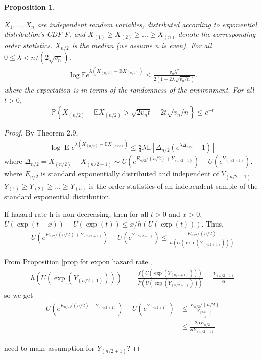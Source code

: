 \documentclass{article}
\theoremstyle{plain}
\newtheorem{prop}{Proposition}
\begin{document}
\begin{prop}
\label{prop 4.6}

$X_1, ..., X_n$ are independent random variables, distributed according to exponential distribution's CDF F, and $X_{(1)} \geq X_{(2)} \geq ... \geq X_{(n)}$ denote the corresponding order statistics. $X_{n/2}$ is the median (we assume n is even). For all $0 \leq \lambda<n /\left(2 \sqrt{v_{n}}\right)$, 
\begin{align}
    \log \mathbb{E}e^{\lambda\left(X_{(n / 2)}-\mathrm{E} X_{(n / 2)}\right)} \leq \frac{v_{n} \lambda^{2}}{2\left(1-2 \lambda \sqrt{v_{n} / n}\right)}.
\end{align}
where the expectation is in terms of the randomness of the environment. For all $t > 0$,
\begin{align}
    \mathbb{P}\left\{X_{(n / 2)}-\mathbb{E} X_{(n / 2)}>\sqrt{2 v_{n} t}+2 t \sqrt{v_{n} / n}\right\} \leq e^{-t}
\end{align}
\end{prop}

\begin{proof}
By \cite{boucheron2012} Theorem 2.9, 
\begin{align}
    \log \operatorname{E} e^{\lambda\left(X_{(n / 2)}-\mathbb{E} X_{(n / 2)}\right)} \leq \frac{n}{4} \lambda \mathbb{E}\left[\Delta_{n / 2}\left(e^{\lambda \Delta_{n / 2}}-1\right)\right]
\end{align}
where $\Delta_{n / 2}=X_{(n / 2)}-X_{(n / 2+1)} \sim U\left(e^{E_{n / 2} /(n / 2)+Y_{(n / 2+1)}} \right)-U\left(e^{Y_{(n / 2+1)}}\right).$ where $E_{n/2}$ is standard exponentially distributed and independent of $Y_{(n/2 + 1)}$. $Y_{(1)} \geq Y_{(2)} \geq ... \geq Y_{(n)}$ is the order statistics of an independent sample of the standard exponential distribution. 

If hazard rate h is non-decreasing, then for all $t > 0$ and $x > 0$, $U(\exp (t+x))-U(\exp (t)) \leq x / h(U(\exp (t)))$. Thus, 
\begin{align}
    U\left(e^{E_{n / 2} /(n / 2)+Y_{(n / 2+1)}} \right)-U\left(e^{Y_{(n / 2+1)}}\right) \leq \frac{E_{n / 2} /(n / 2)}{h(U(\exp{(Y_{(n/2+1)})}))}
\end{align}

From Proposition \ref{prop for expon hazard rate}, 
\begin{align}
    h(U(\exp{(Y_{(n/2+1)})})) &= \frac{f(U(\exp (Y_{(n/2+1)})))}{\overline{F}({U}(\exp (Y_{(n/2+1)})))} = \frac{Y_{(n/2+1)}}{\alpha} 
\end{align}
so we get 
\begin{align}
    U\left(e^{E_{n / 2} /(n / 2)+Y_{(n / 2+1)}} \right)-U\left(e^{Y_{(n / 2+1)}}\right) 
    &\leq \frac{E_{n / 2} /(n / 2)}{\frac{Y_{(n/2+1)}}{\alpha} }\\
    &\leq \frac{ 2\alpha E_{n / 2} }{n Y_{(n/2+1)}}
\end{align}

need to make assumption for $Y_{(n/2+1)}$?
\end{proof}


\printbibliography
\end{document}
